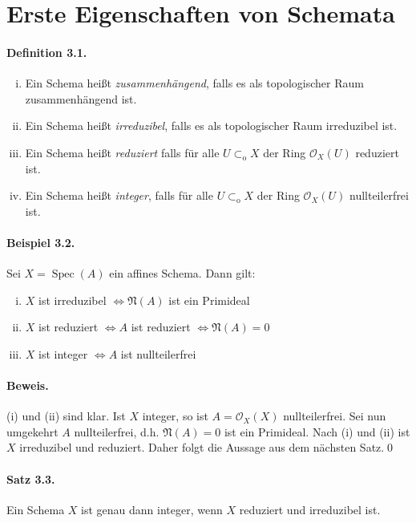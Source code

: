 \section{Erste Eigenschaften von Schemata}

\paragraph{Definition 3.1.}\label{3.1} \begin{enumerate}[(i)]
\item Ein Schema heißt \textit{zusammenhängend}, falls es als topologischer Raum zu\-sam\-men\-hän\-gend ist.
\item Ein Schema heißt \textit{irreduzibel}, falls es als topologischer Raum irreduzibel ist.
\item Ein Schema heißt \textit{reduziert} falls für alle $U\subset_\text{o}X$ der Ring $\mathcal{O}_X(U)$ reduziert ist.
\item Ein Schema heißt \textit{integer}, falls für alle $U\subset_\text{o}X$ der Ring $\mathcal{O}_X(U)$ nullteilerfrei ist.
\end{enumerate}

\paragraph{Beispiel 3.2.}\label{3.2} Sei $X=\operatorname{Spec}(A)$ ein affines Schema. Dann gilt:
\begin{enumerate}[(i)]
\item $X$ ist irreduzibel $\iff \mathfrak{N}(A)$ ist ein Primideal
\item $X$ ist reduziert $\iff A$ ist reduziert $\iff\mathfrak{N}(A)=0$
\item $X$ ist integer $\iff A$ ist nullteilerfrei
\end{enumerate}

\paragraph{Beweis.} (i) und (ii) sind klar. Ist $X$ integer, so ist $A=\mathcal{O}_X(X)$ nullteilerfrei. Sei nun umgekehrt $A$ nullteilerfrei, d.h. $\mathfrak{N}(A)=0$ ist ein Primideal. Nach (i) und (ii) ist $X$ irreduzibel und reduziert. Daher folgt die Aussage aus dem nächsten Satz.\qed

\paragraph{Satz 3.3.}\label{3.3} Ein Schema $X$ ist genau dann integer, wenn $X$ reduziert und irreduzibel ist.

